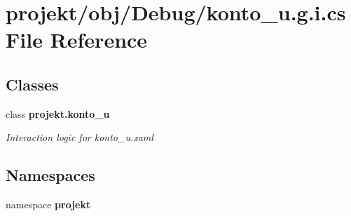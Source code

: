 \section{projekt/obj/\+Debug/konto\+\_\+u.g.\+i.\+cs File Reference}
\label{Debug_2konto__u_8g_8i_8cs}
\subsection*{Classes}
\begin{DoxyCompactItemize}
\item 
class \textbf{ projekt.\+konto\+\_\+u}
\begin{DoxyCompactList}\small\item\em Interaction logic for konto\+\_\+u.\+xaml \end{DoxyCompactList}\end{DoxyCompactItemize}
\subsection*{Namespaces}
\begin{DoxyCompactItemize}
\item 
namespace \textbf{ projekt}
\end{DoxyCompactItemize}
